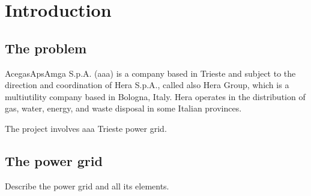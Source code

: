 \chapter{Introduction}

\section{The problem}

AcegasApsAmga S.p.A. (\acrshort{aaa}) is a company based in Trieste and subject to the direction and coordination of Hera S.p.A., called also Hera Group, which is a multiutility company based in Bologna, Italy. Hera operates in the distribution of gas, water, energy, and waste disposal in some Italian provinces.

The project involves \acrshort{aaa} Trieste power grid.



\section{The power grid}

Describe the power grid and all its elements.